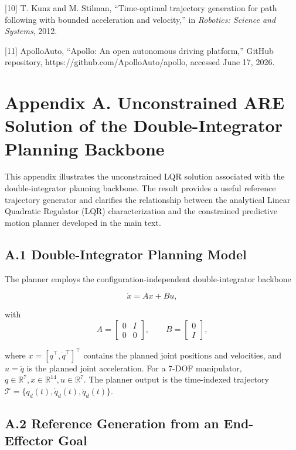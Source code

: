 {[}10{]} T. Kunz and M. Stilman, ``Time-optimal trajectory generation
for path following with bounded acceleration and velocity,'' in
\emph{Robotics: Science and Systems}, 2012.

{[}11{]} ApolloAuto, ``Apollo: An open autonomous driving platform,''
GitHub repository, https://github.com/ApolloAuto/apollo, accessed June
17, 2026.

\section{Appendix A. Unconstrained ARE Solution of the Double-Integrator
Planning
Backbone}\label{appendix-a.-unconstrained-are-solution-of-the-double-integrator-planning-backbone}

This appendix illustrates the unconstrained LQR solution associated with
the double-integrator planning backbone. The result provides a useful
reference trajectory generator and clarifies the relationship between
the analytical Linear Quadratic Regulator (LQR) characterization and the
constrained predictive motion planner developed in the main text.

\subsection{A.1 Double-Integrator Planning
Model}\label{a.1-double-integrator-planning-model}

The planner employs the configuration-independent double-integrator
backbone

\[ \dot x = Ax + Bu,\]

with
\[ A= \begin{bmatrix} 0&I\\ 0&0\end{bmatrix}, \qquad B=\begin{bmatrix}0\\I\end{bmatrix},\]

where \(x=[q^\top, \dot q ^\top ]^\top\) contains the planned joint
positions and velocities, and \(u=\ddot q\) is the planned joint
acceleration. For a 7-DOF manipulator, \(q\in\mathbb{R}^7,
x\in\mathbb{R}^{14},
u\in\mathbb{R}^{7}.\) The planner output is the time-indexed trajectory
\(\mathcal T = \{q_d(t),\dot q_d(t),\ddot q_d(t)\}.\)

\subsection{A.2 Reference Generation from an End-Effector
Goal}\label{a.2-reference-generation-from-an-end-effector-goal}

